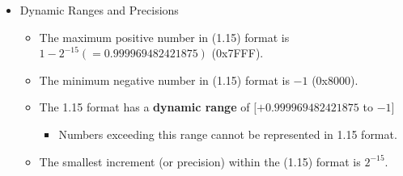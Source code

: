 \begin{itemize}
	\item Dynamic Ranges and Precisions
	\begin{itemize}
		\item The maximum positive number in (1.15) format is $1 − 2^{−15} (= 0.999969482421875)$ (0x7FFF).
		\item The minimum negative number in (1.15) format is $−1$ (0x8000). 
		\item The 1.15 format has a \textbf{dynamic range} of $[+0.999969482421875$ to $−1]$
		\begin{itemize}
			\item Numbers exceeding this range cannot be represented in 1.15 format. 
		\end{itemize} 
		\item The smallest increment (or precision) within the (1.15) format is $2^{−15}$.
	\end{itemize}
\end{itemize}

